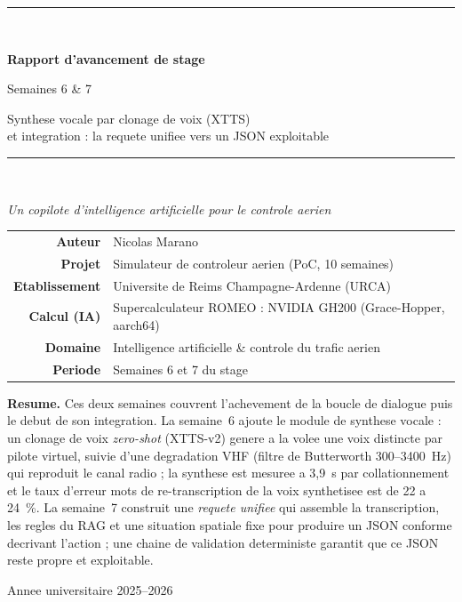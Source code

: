 \documentclass[11pt,a4paper]{article}
\begin{document}
\begin{titlepage}
\centering
\vspace*{1.2cm}
{\color{atcblue}\rule{\textwidth}{2pt}}\\[0.5cm]
{\Huge\bfseries\color{atcblue} Rapport d'avancement de stage\par}
\vspace{0.35cm}
{\LARGE\color{atcteal} Semaines 6 \& 7\par}
\vspace{0.25cm}
{\large Synthese vocale par clonage de voix (XTTS) \\[2pt]
et integration : la requete unifiee vers un JSON exploitable\par}
\vspace{0.4cm}
{\color{atcblue}\rule{\textwidth}{2pt}}\\[1.0cm]

{\large\itshape Un copilote d'intelligence artificielle pour le controle aerien\par}
\vspace{1.6cm}

\begin{tabular}{rl}
\large\bfseries Auteur & \large Nicolas Marano\\[4pt]
\large\bfseries Projet & \large Simulateur de controleur aerien (PoC, 10 semaines)\\[4pt]
\large\bfseries Etablissement & \large Universite de Reims Champagne-Ardenne (URCA)\\[4pt]
\large\bfseries Calcul (IA) & \large Supercalculateur ROMEO : NVIDIA GH200 (Grace-Hopper, aarch64)\\[4pt]
\large\bfseries Domaine & \large Intelligence artificielle \& controle du trafic aerien\\[4pt]
\large\bfseries Periode & \large Semaines 6 et 7 du stage\\
\end{tabular}

\vfill
\begin{tcolorbox}[colback=lightgray, colframe=atcblue, arc=3pt, width=0.92\textwidth, center,
  left=12pt, right=12pt, top=8pt, bottom=8pt]
\small\centering
\textbf{Resume.} Ces deux semaines couvrent l'achevement de la boucle de dialogue
puis le debut de son integration. La semaine~6 ajoute le module de synthese vocale :
un clonage de voix \emph{zero-shot} (XTTS-v2) genere a la volee une voix distincte par
pilote virtuel, suivie d'une degradation VHF (filtre de Butterworth 300--3400~Hz) qui
reproduit le canal radio ; la synthese est mesuree a 3,9~s par collationnement et le
taux d'erreur mots de re-transcription de la voix synthetisee est de 22 a 24~\%. La
semaine~7 construit une \emph{requete unifiee} qui assemble la transcription, les
regles du RAG et une situation spatiale fixe pour produire un JSON conforme decrivant
l'action ; une chaine de validation deterministe garantit que ce JSON reste propre et
exploitable.
\end{tcolorbox}
\vspace{0.6cm}
{\small Annee universitaire 2025--2026}
\end{titlepage}
\end{document}
